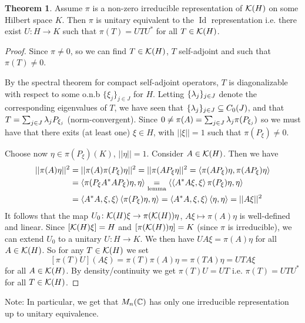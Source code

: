 \documentclass[10pt,english,a4paper]{article}
\theoremstyle{definition}
\newtheorem*{theorem}{Theorem}
\DeclareMathOperator{\Id}{Id}
\begin{document}
\begin{theorem}
    Assume $\pi$ is a non-zero irreducible representation of $\mathcal{K}(H)$ on some
Hilbert space $K$. Then $\pi$ is unitary equivalent to the $\Id$ representation
i.e.  there exist $U\colon H\to K$ such that $\pi(T) = UTU^*$ for all $T\in
\mathcal{K}(H)$.
\end{theorem}
\begin{proof}
    Since $\pi\neq 0$, so we can find $T\in \mathcal{K}(H)$, $T$ self-adjoint and such that 
$\pi(T)\neq 0$.

By the spectral theorem for compact self-adjoint operators, $T$ is diagonalizable 
with respect to some o.n.b $\{\xi_j\}_{j\in J}$ for $H$. Letting
$\{\lambda_{j}\}_{j\in J}$ denote the corresponding eigenvalues of $T$, we have seen that 
$\{\lambda_j\}_{j\in J} \subseteq C_{0}(J)$, and that $T = \sum_{j\in J}\lambda_j P_{\xi_j}$
(norm-convergent). Since $0\neq\pi(A) = \sum_{j\in J}\lambda_j \pi(P_{\xi_j})$
so we must have that there exits (at least one) $\xi \in H$, with $||\xi||=1$
such that $\pi(P_{\xi})\neq 0$. 

Choose now $\eta \in \pi(P_{\xi})(K)$, $||\eta||=1$. Consider $A \in \mathcal{K}(H)$. 
Then we have 
\begin{align*}
||\pi(A)\eta||^2 &= ||\pi(A)\pi(P_{\xi})\eta||^2    
=||\pi(AP_{\xi}\eta||^2 = \left\langle \pi(AP_{\xi})\eta, \pi(AP_{\xi})\eta \right\rangle \\
&= \left\langle \pi(P_{\xi}A^*AP_{\xi})\eta, \eta \right\rangle
\underset{\text{lemma}}{=} \left\langle \left\langle A^*A\xi,\xi \right\rangle\pi(P_{\xi})\eta,\eta \right\rangle \\
&= \left\langle A^*A,\xi,\xi \right\rangle\left\langle \pi(P_{\xi})\eta,\eta \right\rangle =\left\langle A^*A,\xi,\xi \right\rangle\left\langle \eta,\eta \right\rangle
= ||A\xi||^2   
\end{align*}
It follows that the map $U_0\colon \mathcal{K}(H)\xi \to \pi(\mathcal{K}(H))\eta$, $A\xi\mapsto \pi(A)\eta$
is well-defined and linear. Since $[\mathcal{K}(H)\xi] = H$ and $[\pi(\mathcal{K}(H))\eta] = K$ (since $\pi$ is irreducible), we can extend $U_0$ to a unitary $U\colon H\to K$. We then have $UA\xi = \pi(A)\eta$
for all $A \in \mathcal{K}(H)$. So for any $T \in \mathcal{K}(H)$ we set 
\[ [\pi(T)U](A\xi) = \pi(T)\pi(A)\eta = \pi(TA)\eta = UTA\xi \]
for all $A \in \mathcal{K}(H)$.
By density/continuity we get $\pi(T)U = UT$ i.e. 
$\pi(T) = UTU^*$ for all $T \in \mathcal{K}(H)$.
\end{proof}

Note: In particular, we get that $M_n(\mathbb{C})$ has only one irreducible representation 
up to unitary equivalence. 
\end{document}
